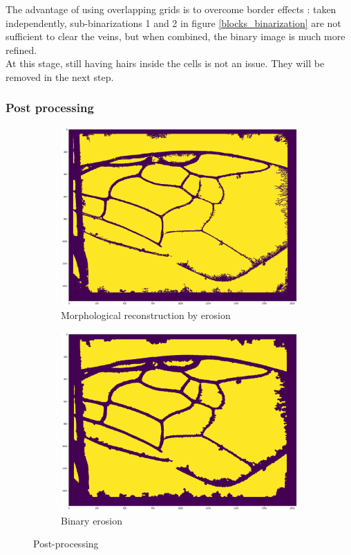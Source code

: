 \documentclass[a4paper]{article}
\begin{document}
The advantage of using overlapping grids is to overcome border effects : taken independently, sub-binarizations 1 and 2 in figure \ref{blocks_binarization} are not sufficient to clear the veins, but when combined, the binary image is much more refined.\\
At this stage, still having hairs inside the cells is not an issue. They will be removed in the next step.

\subsubsection{Post processing}

\begin{figure}[H]

    \begin{subfigure}[t]{.5\textwidth}
    \centering
    \includegraphics[width=\textwidth]{figures/cleared.png}
    \caption{Morphological reconstruction by erosion}
\end{subfigure}
    \begin{subfigure}[t]{.5\textwidth}
    \centering
    \includegraphics[width=\textwidth]{figures/eroded.png}
    \caption{Binary erosion}
\end{subfigure}
\caption{Post-processing}
\label{postprocessing}
\end{figure}
\end{document}
